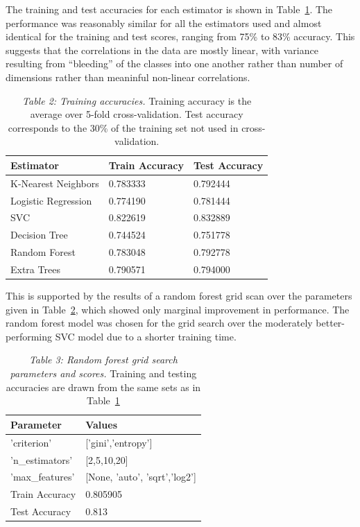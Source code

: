 \documentclass[11pt]{revtex4-1}
\newcommand{\tableref}[1]{Table~\ref{table:#1}}
\begin{document}
The training and test accuracies for each estimator is shown in
\tableref{accuracies}.  The performance was reasonably similar for all
the estimators used and almost identical for the training and test
scores, ranging from 75\% to 83\% accuracy.  This suggests that the
correlations in the data are mostly linear, with variance resulting
from ``bleeding'' of the classes into one another rather than number
of dimensions rather than meaninful non-linear correlations.

\begin{table}
    \begin{tabular}{|l|l|l|}
      \hline
      Estimator & Train Accuracy & Test Accuracy \\
      \hline
      K-Nearest Neighbors & 0.783333 & 0.792444 \\
      Logistic Regression & 0.774190 & 0.781444 \\
      SVC & 0.822619 & 0.832889 \\
      Decision Tree & 0.744524 & 0.751778 \\
      Random Forest & 0.783048 & 0.792778 \\
      Extra Trees & 0.790571 & 0.794000 \\
      \hline
    \end{tabular}
  \label{table:accuracies}
  \caption{\emph{Table 2: Training accuracies.}  Training accuracy is
    the average over 5-fold cross-validation.  Test accuracy
    corresponds to the 30\% of the training set not used in
    cross-validation.}
\end{table}

This is supported by the results of a random forest grid scan over the
parameters given in \tableref{rfgrid}, which showed only marginal
improvement in performance.  The random forest model was chosen for
the grid search over the moderately better-performing SVC model due to
a shorter training time.

\begin{table}
    \begin{tabular}{|l|l|}
      \hline
      Parameter & Values \\
      \hline
      'criterion' & ['gini','entropy'] \\
      'n\_estimators' & [2,5,10,20] \\
      'max\_features' & [None, 'auto', 'sqrt','log2'] \\
      \hline
      Train Accuracy & 0.805905 \\
      Test Accuracy & 0.813 \\
      \hline
    \end{tabular}
    \label{table:rfgrid}
    \caption{\emph{Table 3: Random forest grid search parameters and
        scores.}  Training and testing accuracies are drawn from the
      same sets as in \tableref{accuracies}}
\end{table}
\end{document}
